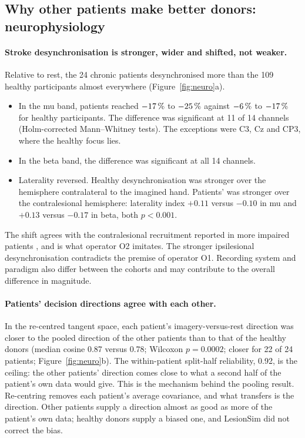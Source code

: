\subsection{Why other patients make better donors: neurophysiology}
\label{sec:neuro}

\paragraph{Stroke desynchronisation is stronger, wider and shifted, not weaker.} Relative to rest, the 24 chronic patients desynchronised more than the 109 healthy participants almost everywhere (Figure~\ref{fig:neuro}a).
\begin{itemize}
  \item In the mu band, patients reached $-17\,\%{}$ to $-25\,\%{}$ against $-6\,\%{}$ to $-17\,\%{}$ for healthy participants. The difference was significant at 11 of 14 channels (Holm-corrected Mann--Whitney tests). The exceptions were C3, Cz and CP3, where the healthy focus lies.
  \item In the beta band, the difference was significant at all 14 channels.
  \item Laterality reversed. Healthy desynchronisation was stronger over the hemisphere contralateral to the imagined hand. Patients' was stronger over the contralesional hemisphere: laterality index $+0.11$ versus $-0.10$ in mu and $+0.13$ versus $-0.17$ in beta, both $p < 0.001$.
\end{itemize}
The shift agrees with the contralesional recruitment reported in more impaired patients \citep{mansour2022}, and is what operator O2 imitates. The stronger ipsilesional desynchronisation contradicts the premise of operator O1. Recording system and paradigm also differ between the cohorts and may contribute to the overall difference in magnitude.

\paragraph{Patients' decision directions agree with each other.} In the re-centred tangent space, each patient's imagery-versus-rest direction was closer to the pooled direction of the other patients than to that of the healthy donors (median cosine 0.87 versus 0.78; Wilcoxon $p = 0.0002$; closer for 22 of 24 patients; Figure~\ref{fig:neuro}b). The within-patient split-half reliability, 0.92, is the ceiling: the other patients' direction comes close to what a second half of the patient's own data would give. This is the mechanism behind the pooling result. Re-centring removes each patient's average covariance, and what transfers is the direction. Other patients supply a direction almost as good as more of the patient's own data; healthy donors supply a biased one, and LesionSim did not correct the bias.


